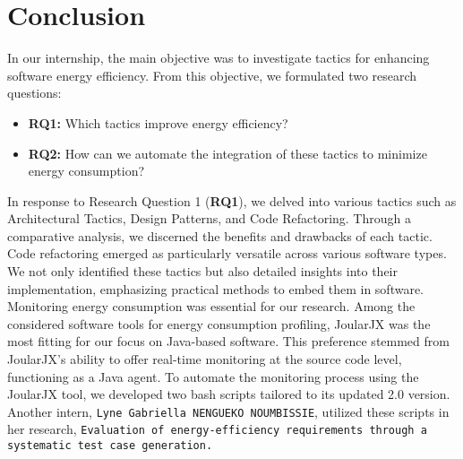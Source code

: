 \section{Conclusion}
In our internship, the main objective was to investigate tactics for enhancing software energy efficiency. From this objective, we formulated two research questions: 
\vspace{-6pt}
\begin{itemize}
    \item \textbf{RQ1:} Which tactics improve energy efficiency?
    \vspace{-8pt}
    \item \textbf{RQ2:} How can we automate the integration of these tactics to minimize energy consumption?
\end{itemize}
\vspace{-5pt}
In response to Research Question 1 (\textbf{RQ1}), we delved into various tactics such as Architectural Tactics, Design Patterns, and Code Refactoring. Through a comparative analysis, we discerned the benefits and drawbacks of each tactic. Code refactoring emerged as particularly versatile across various software types. We not only identified these tactics but also detailed insights into their implementation, emphasizing practical methods to embed them in software. Monitoring energy consumption was essential for our research. Among the considered software tools for energy consumption profiling, JoularJX was the most fitting for our focus on Java-based software. This preference stemmed from JoularJX's ability to offer real-time monitoring at the source code level, functioning as a Java agent. %
To automate the monitoring process using the JoularJX tool, we developed two bash scripts tailored to its updated 2.0 version. %
Another intern, \texttt{Lyne Gabriella NENGUEKO NOUMBISSIE}, utilized these scripts in her research, \texttt{Evaluation of energy-efficiency requirements through a systematic test case
generation.}

